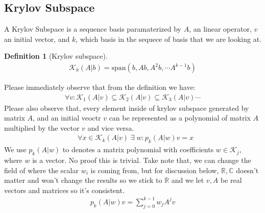 \documentclass[]{article}
\theoremstyle{definition}
\newtheorem{definition}{Definition}
\begin{document}
    \subsection{Krylov Subspace}
        A Krylov Subspace is a sequence basis paramaterized by $A$, an linear operator, $v$ an initial vector, and $k$, which basis in the sequece of basis that we are looking at. 
        \begin{definition}[Krylov subspace]
            \begin{align}
                \mathcal{K}_k(A|b) = \text{span}( b, Ab, A^2b, \cdots A^{k - 1}b)
            \end{align}
        \end{definition}
        \noindent
        Please immediately observe that from the definition we have: 
        \begin{align}
            \forall v: \mathcal{K}_1(A|v)  \subseteq  \mathcal{K}_2(A|v)  \subseteq \mathcal{K}_3(A|v)  \cdots 
        \end{align}
        Please also observe that, every element inside of krylov subspace generated by matrix $A$, and an initial veoctr $v$ can be represented as a polynomial of matrix $A$ multiplied by the vector $v$ and vice versa.
        \begin{align}
            & \forall x \in \mathcal K_k(A|v) \;\exists\; w: p_k(A|w)v = x
        \end{align}
        We use $p_k(A|w)$ to denotes a matrix polynomial with coefficients $w\in \mathcal K_j$, where $w$ is a vector. No proof this is trivial. Take note that, we can change the field of where the scalar $w_i$ is coming from, but for discussion below, $\mathbb R, \mathbb C$  doesn't matter and won't change the results so we stick to $\mathbb R$ and we let $v, A$ be real vectors and matrices so it's consistent. 
        \begin{align}
            p_k(A|w)v = \sum_{j = 0}^{k - 1}w_jA^jv
        \end{align}
\end{document}

